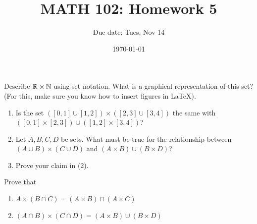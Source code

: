 \documentclass[12pt]{amsart}
\title{ MATH 102: Homework 5}
\author{Due date: Tues, Nov 14}
\date{\today}
\begin{document}
\maketitle

\begin{problem}
    Describe $\mathbb{R} \times \mathbb{N}$ using set notation.
    What is a graphical representation of this set? (For this, make sure you know
    how to insert figures in LaTeX).
\end{problem}


\begin{problem}
    \begin{enumerate}
        \item Is the set $([0,1] \cup [1,2]) \times ([2,3] \cup [3,4])$ the same with 
    $([0,1]\times [2,3])\cup ([1,2]\times [3,4])$?
        \item Let  $A,B,C,D$ be sets. What must be true for the relationship between $(A\cup B) \times (C\cup D)$
    and $(A\times B) \cup (B\times D)$?
        \item Prove your claim in (2).
    \end{enumerate}
\end{problem}

\begin{problem}
    Prove that 
    \begin{enumerate}
        \item $A \times (B\cap C) =  (A\times B) \cap (A \times C)$
        \item $(A\cap B) \times (C\cap D)= (A\times B) \cup (B\times D)$
    \end{enumerate}
\end{problem}
\end{document}
